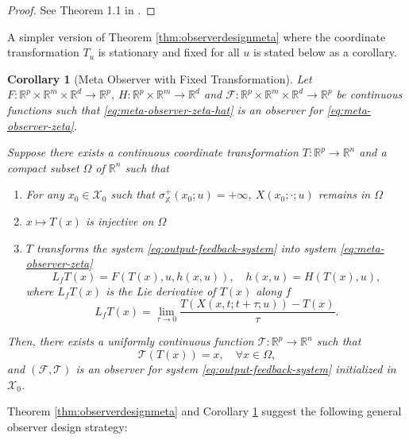 \documentclass[
]{book}
\newtheorem{corollary}{Corollary}[chapter]
\theoremstyle{definition}
\theoremstyle{definition}
\theoremstyle{definition}
\theoremstyle{definition}
\theoremstyle{remark}
\begin{document}
\begin{proof}
See Theorem 1.1 in \citep{bernard19book-observer}.
\end{proof}

A simpler version of Theorem \ref{thm:observerdesignmeta} where the coordinate transformation \(T_u\) is stationary and fixed for all \(u\) is stated below as a corollary.

\begin{corollary}[Meta Observer with Fixed Transformation]
\protect\hypertarget{cor:observerdesignmetafixedT}{}\label{cor:observerdesignmetafixedT}Let \(F: \mathbb{R}^p \times \mathbb{R}^m \times \mathbb{R}^d \rightarrow \mathbb{R}^p\), \(H: \mathbb{R}^p \times \mathbb{R}^m \rightarrow \mathbb{R}^d\) and \(\mathcal{F}: \mathbb{R}^p \times \mathbb{R}^m \times \mathbb{R}^d \rightarrow \mathbb{R}^p\) be continuous functions such that \eqref{eq:meta-observer-zeta-hat} is an observer for \eqref{eq:meta-observer-zeta}.

Suppose there exists a continuous coordinate transformation \(T: \mathbb{R}^p \rightarrow \mathbb{R}^n\) and a compact subset \(\Omega\) of \(\mathbb{R}^n\) such that

\begin{enumerate}
\def\labelenumi{\arabic{enumi}.}
\item
  For any \(x_0 \in \mathcal{X}_0\) such that \(\sigma^+_{\mathbb{X}}(x_0;u) = + \infty\), \(X(x_0;\cdot;u)\) remains in \(\Omega\)
\item
  \(x \mapsto T(x)\) is injective on \(\Omega\)
\item
  \(T\) transforms the system \eqref{eq:output-feedback-system} into system \eqref{eq:meta-observer-zeta}
  \[
  L_f T(x) = F(T(x),u,h(x,u)), \quad h(x,u) = H(T(x),u),
  \]
  where \(L_f T(x)\) is the Lie derivative of \(T(x)\) along \(f\)
  \[
  L_f T(x) = \lim_{\tau \rightarrow 0} \frac{ T(X(x,t;t+\tau;u))  - T(x)}{\tau}.
  \]
\end{enumerate}

Then, there exists a uniformly continuous function \(\mathcal{T}:\mathbb{R}^p \rightarrow \mathbb{R}^{n}\) such that
\[
\mathcal{T}(T(x)) = x, \quad \forall x \in \Omega,
\]
and \((\mathcal{F},\mathcal{T})\) is an observer for system \eqref{eq:output-feedback-system} initialized in \(\mathcal{X}_0\).
\end{corollary}

Theorem \ref{thm:observerdesignmeta} and Corollary \ref{cor:observerdesignmetafixedT} suggest the following general observer design strategy:
\end{document}
